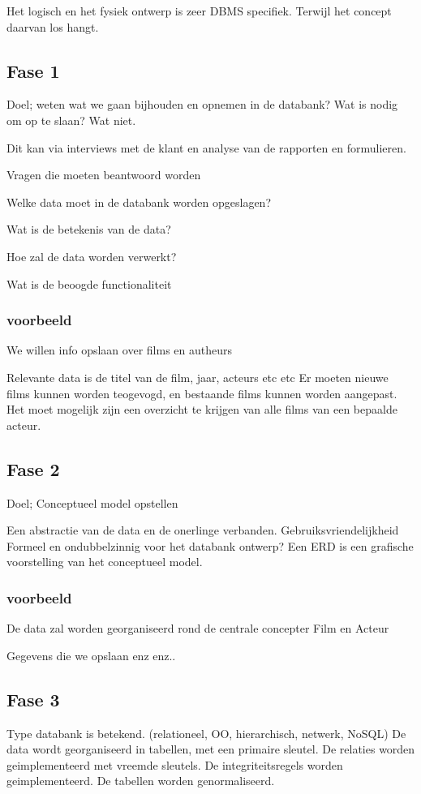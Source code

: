 \documentclass{article}
\begin{document}
Het logisch en het fysiek ontwerp is zeer DBMS specifiek. Terwijl het concept daarvan los hangt.

\subsection{Fase 1}
Doel; weten wat we gaan bijhouden en opnemen in de databank?
Wat is nodig om op te slaan? Wat niet.

Dit kan via interviews met de klant en analyse van de rapporten en formulieren.

Vragen die moeten beantwoord worden

Welke data moet in de databank worden opgeslagen?

Wat is de betekenis van de data?

Hoe zal de data worden verwerkt?

Wat is de beoogde functionaliteit

\subsubsection{voorbeeld}
We willen info opslaan over films en autheurs

Relevante data is de titel van de film, jaar, acteurs etc etc
Er moeten nieuwe films kunnen worden teogevogd, en bestaande films kunnen worden aangepast.
Het moet mogelijk zijn een overzicht te krijgen van alle films van een bepaalde acteur.

\subsection{Fase 2}
Doel; Conceptueel model opstellen

Een abstractie van de data en de onerlinge verbanden.
Gebruiksvriendelijkheid
Formeel en ondubbelzinnig voor het databank ontwerp?
Een ERD is een grafische voorstelling van het conceptueel model.

\subsubsection{voorbeeld}
De data zal worden georganiseerd rond de centrale concepter Film en Acteur

Gegevens die we opslaan
enz enz..

\subsection{Fase 3}
Type databank is betekend. (relationeel, OO, hierarchisch, netwerk, NoSQL)
De data wordt georganiseerd in tabellen, met een primaire sleutel.
De relaties worden geimplementeerd met vreemde sleutels.
De integriteitsregels worden geimplementeerd.
De tabellen worden genormaliseerd.
\end{document}
